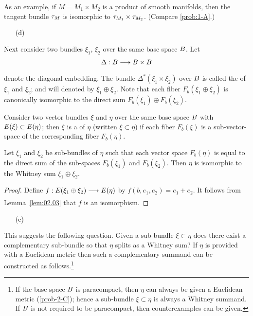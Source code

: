\documentclass[../main]{subfiles}
\begin{document}
As an example, if $M = M_1 \times M_2$ is a product of smooth manifolds, then the tangent bundle $\tau_{M}$ is isomorphic to $\tau_{M_1}\times \tau_{M_2}$. (Compare \ref{prob:1-A}.)
\begin{enumerate}
    \item[(d)] 
\end{enumerate}
Next consider two bundles $\xi_1$, $\xi_2$ over the same base space $B$. Let
\[
\Delta : \B\varrightarrow{} \B\times\B
\]
denote the diagonal embedding. The bundle $\Delta^*(\xi_1\times\xi_2)$ over $B$ is
called the  of $\xi_1$ and $\xi_2$; and will denoted by $\xi_1\oplus\xi_2$. Note that each fiber $F_b(\xi_1\oplus\xi_2)$ is canonically isomorphic to the direct sum $F_b(\xi_1)\oplus F_b(\xi_2)$.


\begin{definition}\label{def:03.02}
Consider two vector bundles $\xi$ and $\eta$ over the same base space $B$ with $E(\xi ) \subset E(\eta)$; then $\xi$ is a  of $\eta$ (written $\xi\subset\eta$) if each fiber $F_b(\xi)$ is a sub-vector-space of the corresponding fiber $F_b(\eta)$.
\end{definition}


\begin{lemma}\label{lem:03.02}
Let $\xi_1$ and $\xi_2$ be sub-bundles of $\eta$ such that each vector space $F_b (\eta)$ is equal to the direct sum of the sub-spaces $F_b (\xi_1)$ and $F_b (\xi_2)$. Then $\eta$ is isomorphic to the Whitney sum $\xi_1\oplus\xi_2$.
\end{lemma}


\begin{proof}
Define $f : \total(\xi_1\oplus\xi_2) \varrightarrow{} \total(\eta)$ by $f(b,e_1,e_2) = e_1 + e_2$. It follows from Lemma~\ref{lem:02.03} that $f$ is an isomorphism.
\end{proof}


\begin{enumerate}
    \item[(e)] 
\end{enumerate}
This suggests the following question. Given a sub-bundle $\xi\subset\eta$ does there exist a complementary sub-bundle so that $\eta$ splits as a Whitney sum? If $\eta$ is provided with a Euclidean metric then such a complementary summand can be constructed as follows.\footnote{If the base space $B$ is paracompact, then $\eta$ can always be given a Euclidean metric (\ref{prob-2-C}); hence a sub-bundle $\xi\subset\eta$ is always a Whitney summand. If $B$ is not required to be paracompact, then counterexamples can be given.}
\end{document}
